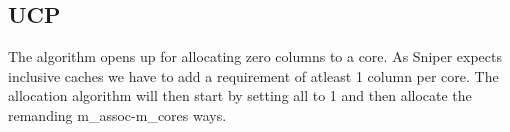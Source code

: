
\subsection{UCP}
\label{sec:background:algorithms:ucp}

The algorithm opens up for allocating zero columns to a core. 
As Sniper expects inclusive caches we have to add a requirement of atleast 1 column per core. 
The allocation algorithm will then start by setting all to 1 and then allocate the remanding m\_assoc-m\_cores ways.
